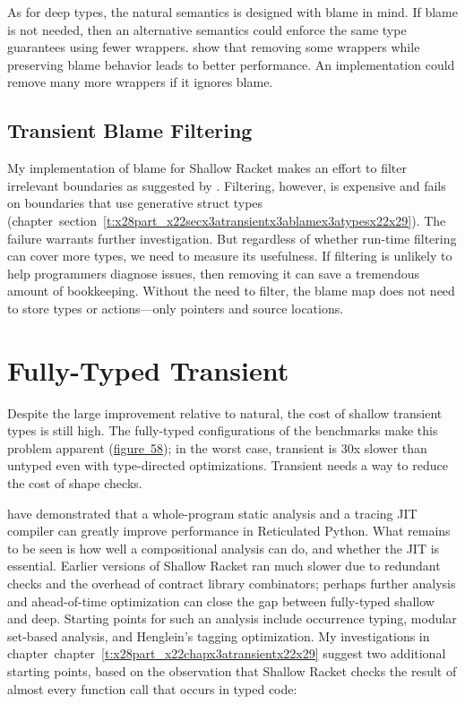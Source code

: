 \documentclass[ twoside,open=right,titlepage,numbers=noenddot,headinclude,%
                footinclude=true,cleardoublepage=empty,abstract=off,
                BCOR=5mm,paper=a4,fontsize=11pt,%
                ngerman,american,%
                parts,pdfspacing]{scrreprt}
\newcommand{\ChapRef}[2]{\SecRef{#1}{#2}}
\newcommand{\SecRef}[2]{section~#1}
\newcommand{\ChapRefLocal}[3]{\hyperref[#1]{\ChapRef{#2}{#3}}}
\newcommand{\SecRefLocal}[3]{\hyperref[#1]{\SecRef{#2}{#3}}}
\let\SOriginalthesubsubsection\thesubsubsection
\newcommand{\Ssubsection}[2]{\subsection[#1]{#2}\let\thesubsubsection\SOriginalthesubsubsection}
\newcommand{\Ssubsubsection}[2]{\subsubsection[#1]{#2}}
\newcommand{\FigureRef}[2]{#1}
\renewcommand{\Ssubsection}[2]{\section[#1]{#2}}
\renewcommand{\Ssubsubsection}[2]{\subsection[#1]{#2}}
\renewcommand{\ChapRefLocal}[3]{chapter~\ref{#1}}
\renewcommand{\SecRefLocal}[3]{section~\ref{#1}}
\begin{document}
As for deep types, the natural semantics is designed with blame in
 mind.
If blame is not needed, then an alternative semantics could enforce the same type guarantees
 using fewer wrappers.
 show that removing some wrappers while preserving
 blame behavior leads to better performance.
An implementation could remove many more wrappers if it ignores blame.

\Ssubsubsection{Transient Blame Filtering}{Transient Blame Filtering}\label{t:x28part_x22Transientx5fBlamex5fFilteringx22x29}

My implementation of blame for Shallow Racket makes an effort to filter
 irrelevant boundaries as suggested by .
Filtering, however, is expensive and fails on boundaries that use
 generative struct types (chapter~\SecRefLocal{t:x28part_x22secx3atransientx3ablamex3atypesx22x29}{5.2.6}{Types at Runtime}).
The failure warrants further investigation.
But regardless of whether run{-}time filtering can cover more types,
 we need to measure its usefulness.
If filtering is unlikely to help programmers diagnose issues,
 then removing it can save a tremendous amount of bookkeeping.
Without the need to filter, the blame map does not need to store types or
 actions{---}only pointers and source locations.

\Ssubsection{Fully{-}Typed Transient}{Fully{-}Typed Transient}\label{t:x28part_x22Fullyx2dTypedx5fTransientx22x29}

Despite the large improvement relative to natural, the cost of
 shallow transient types is still high.
The fully{-}typed configurations of the benchmarks make this problem apparent (\hyperref[t:x28counter_x28x22figurex22_x22figx3atransientx3aratiox22x29x29]{figure~\FigureRef{58}{t:x28counter_x28x22figurex22_x22figx3atransientx3aratiox22x29x29}});
 in the worst case, transient is 30x slower than untyped even with type{-}directed optimizations.
Transient needs a way to reduce the cost of shape checks.

 have demonstrated that a whole{-}program static analysis
 and a tracing JIT compiler can greatly improve performance in Reticulated Python.
What remains to be seen is how well a compositional analysis can do, and
 whether the JIT is essential.
Earlier versions of Shallow Racket ran much slower due to redundant checks
 and the overhead of contract library combinators; perhaps further analysis
 and ahead{-}of{-}time optimization can close the gap between fully{-}typed shallow
 and deep.
Starting points for such an analysis include occurrence typing,
 modular set{-}based analysis, and Henglein{'}s tagging optimization.
My investigations in chapter~\ChapRefLocal{t:x28part_x22chapx3atransientx22x29}{5}{Shallow Racket} suggest two additional
 starting points, based on the observation that Shallow Racket checks the
 result of almost every function call that occurs in typed code:
\end{document}
